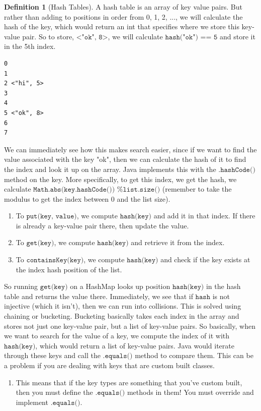 \documentclass{article}
\theoremstyle{definition}
\theoremstyle{remark}
\theoremstyle{definition}
\newtheorem{definition}{Definition}[section]
\begin{document}
\begin{definition}[Hash Tables]
A hash table is an array of key value pairs. But rather than adding to positions in order from 0, 1, 2, ..., we will calculate the hash of the key, which would return an int that specifies where we store this key-value pair. So to store, $\texttt{<"ok", 8>}$, we will calculate $\texttt{hash("ok") == 5}$ and store it in the 5th index.
\begin{verbatim}
0 
1 
2 <"hi", 5>
3 
4 
5 <"ok", 8>
6 
7 
\end{verbatim}
We can immediately see how this makes search easier, since if we want to find the value associated with the key "ok", then we can calculate the hash of it to find the index and look it up on the array. Java implements this with the $\texttt{.hashCode()}$ method on the key. More specifically, to get this index, we get the hash, we calculate $\texttt{Math.abs(key.hashCode()) \% list.size()}$ (remember to take the modulus to get the index between 0 and the list size). 
\begin{enumerate}
    \item To $\texttt{put(key, value)}$, we compute $\texttt{hash(key)}$ and add it in that index. If there is already a key-value pair there, then update the value. 
    \item To $\texttt{get(key)}$, we compute $\texttt{hash(key)}$ and retrieve it from the index. 
    \item To $\texttt{containsKey(key)}$, we compute $\texttt{hash(key)}$ and check if the key exists at the index hash position of the list.
\end{enumerate}
So running $\texttt{get(key)}$ on a HashMap looks up position $\texttt{hash(key)}$ in the hash table and returns the value there. Immediately, we see that if $\texttt{hash}$ is not injective (which it isn't), then we can run into collisions. This is solved using chaining or bucketing. Bucketing basically takes each index in the array and stores not just one key-value pair, but a list of key-value pairs. So basically, when we want to search for the value of a key, we compute the index of it with $\texttt{hash(key)}$, which would return a list of key-value pairs. Java would iterate through these keys and call the $\texttt{.equals()}$ method to compare them. This can be a problem if you are dealing with keys that are custom built classes.
\begin{enumerate}
    \item This means that if the key types are something that you've custom built, then you must define the $\texttt{.equals()}$ methods in them! You must override and implement $\texttt{.equals()}$. 

\end{enumerate}
\end{definition}
\end{document}
